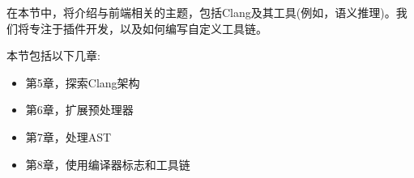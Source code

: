 在本节中，将介绍与前端相关的主题，包括Clang及其工具(例如，语义推理)。我们将专注于插件开发，以及如何编写自定义工具链。

本节包括以下几章:\par

\begin{itemize}
	\item 第5章，探索Clang架构
	\item 第6章，扩展预处理器
	\item 第7章，处理AST
	\item 第8章，使用编译器标志和工具链
\end{itemize}

\newpage